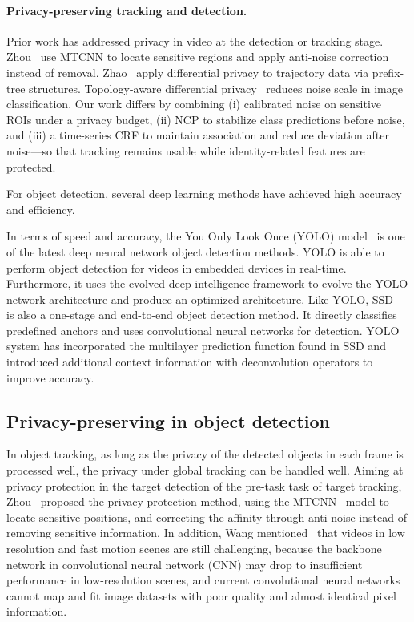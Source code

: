 \documentclass[trans]{IEEEtran}
\begin{document}
\paragraph{Privacy-preserving tracking and detection.} Prior work has addressed privacy in video at the detection or tracking stage. Zhou~\cite{zhou2020personal} use MTCNN to locate sensitive regions and apply anti-noise correction instead of removal. Zhao~\cite{zhao2020novel} apply differential privacy to trajectory data via prefix-tree structures. Topology-aware differential privacy~\cite{guo2021topology} reduces noise scale in image classification. Our work differs by combining (i) calibrated noise on sensitive ROIs under a privacy budget, (ii) NCP to stabilize class predictions before noise, and (iii) a time-series CRF to maintain association and reduce deviation after noise---so that tracking remains usable while identity-related features are protected.

For object detection, several deep learning methods have achieved high accuracy and efficiency. 

In terms of speed and accuracy, the You Only Look Once (YOLO) model~\cite{farhadi2018yolov3,redmon2016you} is one of the latest deep neural network object detection methods. 
YOLO is able to perform object detection for videos in embedded devices in real-time. Furthermore, it uses the evolved deep intelligence framework to evolve the YOLO network architecture and produce an optimized architecture.
Like YOLO, SSD~\cite{liu2016ssd} is also a one-stage and end-to-end object detection method. 
It directly classifies predefined anchors and uses convolutional neural networks for detection. 
YOLO~\cite{farhadi2018yolov3} system has incorporated the multilayer prediction function found in SSD and introduced additional context information with deconvolution operators to improve accuracy.

\subsection{Privacy-preserving in object detection}
In object tracking, as long as the privacy of the detected objects in each frame is processed well, the privacy under global tracking can be handled well. Aiming at privacy protection in the target detection of the pre-task task of target tracking, Zhou~\cite{zhou2020personal} proposed the privacy protection method, using the MTCNN~\cite{zhang2016joint} model to locate sensitive positions, and correcting the affinity through anti-noise instead of removing sensitive information. In addition, Wang mentioned~\cite{wang2021dynamic} that videos in low resolution and fast motion scenes are still challenging, because the backbone network in convolutional neural network (CNN) may drop to insufficient performance in low-resolution scenes, and current convolutional neural networks cannot map and fit image datasets with poor quality and almost identical pixel information.
\end{document}
